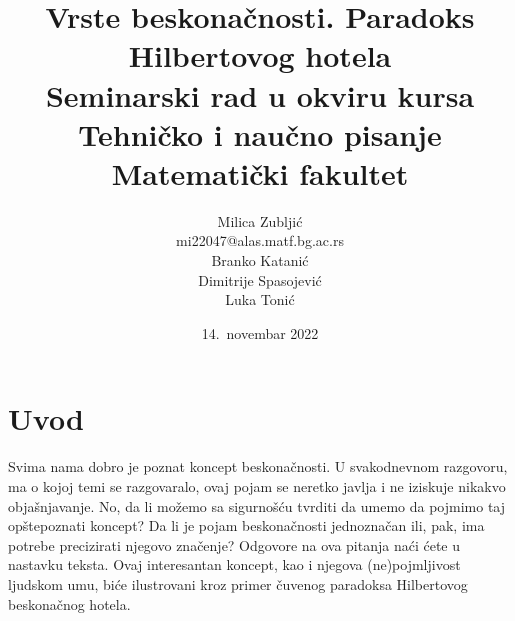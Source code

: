 \documentclass[a4paper]{article}
\begin{document}
\title{Vrste beskonačnosti. Paradoks Hilbertovog hotela\\ \small{Seminarski rad u okviru kursa\\Tehničko i naučno pisanje\\ Matematički fakultet}}

\author{Milica Zubljić\\ mi22047@alas.matf.bg.ac.rs\\ Branko Katanić\\ Dimitrije Spasojević\\ Luka Tonić\\}
\date{14.~novembar 2022}
\maketitle


\newpage

\tableofcontents %

\newpage

\section{Uvod}
\label{poglavlje:uvod}

Svima nama dobro je poznat koncept beskonačnosti. U svakodnevnom razgovoru, ma o kojoj temi se razgovaralo, ovaj pojam se neretko javlja i ne iziskuje nikakvo objašnjavanje. No, da li možemo sa sigurnošću tvrditi da umemo da pojmimo taj opštepoznati koncept? Da li je pojam beskonačnosti jednoznačan ili, pak, ima potrebe precizirati njegovo značenje? Odgovore na ova pitanja naći ćete u nastavku teksta. Ovaj interesantan koncept, kao i njegova (ne)pojmljivost ljudskom umu, biće ilustrovani
kroz primer čuvenog paradoksa Hilbertovog beskonačnog hotela.
\end{document}
